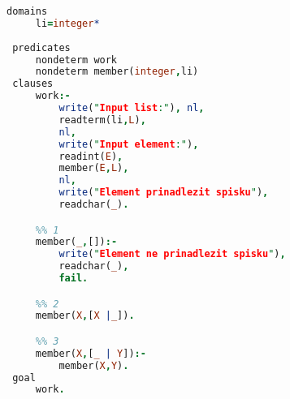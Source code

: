 \begin{lstlisting}[style=source_code,language=prolog,
  caption=Программа проверки факта нахождения заданного элемента в списке,label=lst:check_if_exist]
 domains
     li=integer*
 
 predicates
     nondeterm work
     nondeterm member(integer,li)
 clauses
     work:-
         write("Input list:"), nl,
         readterm(li,L),
         nl,
         write("Input element:"),
         readint(E),
         member(E,L),
         nl,
         write("Element prinadlezit spisku"),
         readchar(_).

     %% 1
     member(_,[]):-
         write("Element ne prinadlezit spisku"),
         readchar(_),
         fail.

     %% 2     
     member(X,[X |_]).

     %% 3
     member(X,[_ | Y]):-
         member(X,Y).
 goal
     work.
\end{lstlisting}

\newpage
